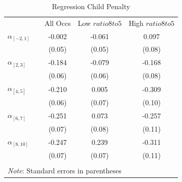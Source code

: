 {
\def\sep{0.6em}
\def\fns{\footnotesize}
\begin{table}[htbp]\centering
\footnotesize
\caption{Regression Child Penalty \label{event_reg}}
\begin{tabular}{l c c c c }
\toprule
                          && All Occs   &  Low $ratio8to5$     & High
                          $ratio8to5$      \tabularnewline[\sep]
$\alpha_[-2,1]$              && -0.002    & -0.061      & 0.097    \tabularnewline
                          &&\fns{(0.05)}&\fns{(0.05)} & \fns{(0.08)} \tabularnewline[\sep]
$\alpha_[2,3]$               && -0.184    & -0.079      & -0.168    \tabularnewline
                          &&\fns{(0.06)}&\fns{(0.06)} & \fns{(0.08)} \tabularnewline[\sep]
$\alpha_[4,5]$               && -0.210    & 0.005      & -0.309    \tabularnewline
                          &&\fns{(0.06)}&\fns{(0.07)} & \fns{(0.10)} \tabularnewline[\sep]
$\alpha_[6,7]$               && -0.251    & 0.073      & -0.257    \tabularnewline
                          &&\fns{(0.07)}&\fns{(0.08)} & \fns{(0.11)} \tabularnewline[\sep]
$\alpha_[8,10]$              && -0.247    & 0.239      & -0.311    \tabularnewline
                          &&\fns{(0.07)}&\fns{(0.07)} & \fns{(0.11)} \tabularnewline[\sep]
		  \bottomrule \tabularnewline
		  \multicolumn{5}{p{4in}}{\setstretch{1.9}\scriptsize{	\emph{Note}: Standard errors in parentheses
}}
\end{tabular}
\end{table}
}
